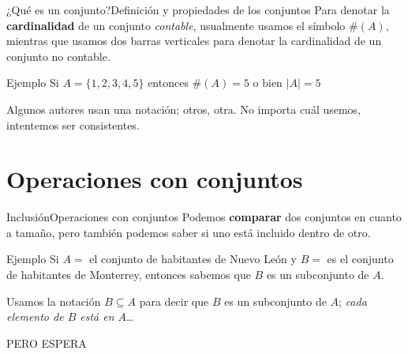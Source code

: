 \documentclass[spanish, c]{beamer}
\begin{document}
\begin{frame}{¿Qué es un conjunto?}{Definición y propiedades de los conjuntos}
    Para denotar la \textbf{cardinalidad} de un conjunto \textit{contable}, usualmente usamos el símbolo $\#(A)$, mientras que usamos dos barras verticales para denotar la cardinalidad de un conjunto no contable.

    \begin{exampleblock}{Ejemplo}
        Si $A = \{1, 2, 3, 4, 5\}$ entonces $\#(A)= 5$ o bien $\vert A \vert = 5$
    \end{exampleblock} \pause

    Algunos autores usan una notación; otros, otra. No importa cuál usemos, intentemos ser consistentes.
\end{frame}

\section{Operaciones con conjuntos}

\begin{frame}{Inclusión}{Operaciones con conjuntos}
    Podemos \textbf{comparar} dos conjuntos en cuanto a tamaño, pero también podemos saber si uno está \alert{incluido} dentro de otro. \pause

    \begin{exampleblock}{Ejemplo}
        Si $A = $ el conjunto de habitantes de Nuevo León y $B = $ es el conjunto de habitantes de Monterrey, entonces sabemos que $B$ es un \alert{subconjunto} de $A$.
    \end{exampleblock} \pause

    Usamos la notación $B \subseteq A$ para decir que $B$ es un \alert{subconjunto} de $A$; \textit{cada elemento de $B$ está en $A$}\dots \pause

    \bigskip

    {\Large PERO ESPERA}
\end{frame}
\end{document}
